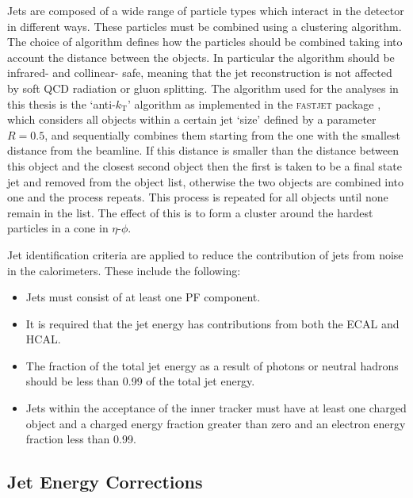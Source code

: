 Jets are composed of a wide range of particle types which interact in the
detector in different ways. These particles must be combined using a clustering
algorithm. The choice of algorithm defines how the particles should be combined
taking into account the distance between the objects. In particular the
algorithm should be infrared- and collinear- safe, meaning that the jet
reconstruction is not affected by soft \ac{QCD} radiation or gluon splitting.
The algorithm used for the
analyses in this thesis is the `anti-$k_{\text{T}}$' algorithm as implemented in
the \textsc{fastjet} package \cite{Cacciari:fastjet1}, which considers all 
objects within a certain jet `size' defined by a parameter $R=0.5$, and 
sequentially combines them starting from the one with the
smallest distance from the beamline. If this distance is smaller than the
distance between this object and the closest second object then the first is
taken to be a final state jet and removed from the object list,
otherwise the two objects are combined into one and the process repeats. 
This process is repeated for all objects until none remain in the list. The effect of this
is to form a cluster around the hardest particles in a cone in $\eta$-$\phi$.

Jet identification criteria are applied to reduce the contribution of jets from
noise in the calorimeters. These include the following:
\begin{itemize}
\item Jets must consist of at least one \ac{PF} component. 
\item It is required that the jet energy has contributions
from both the \ac{ECAL} and \ac{HCAL}.
\item The fraction of the total jet energy as a result of photons or neutral
hadrons should be less than 0.99 of the total jet energy.
\item Jets within the acceptance of the inner tracker must have at least one
charged object and a charged energy fraction greater than zero and an electron
energy fraction less than 0.99. 
\end{itemize}

\subsection{Jet Energy Corrections}
\label{sec:JEC}

